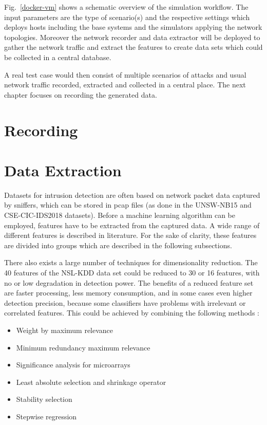 \documentclass[conference]{IEEEtran}
\begin{document}
Fig.~\ref{docker-vm} shows a schematic overview of the simulation workflow. The input parameters are the type of scenario(s) and the respective settings which deploys hosts including the base systems and the simulators applying the network topologies. Moreover the network recorder and data extractor will be deployed to gather the network traffic and extract the features to create data sets which could be collected in a central database.

A real test case would then consist of multiple scenarios of attacks and usual network traffic recorded, extracted and collected in a central place. The next chapter focuses on recording the generated data.

\section{Recording}

\section{Data Extraction}

Datasets for intrusion detection are often based on network packet data captured by sniffers, which can be stored in pcap files (as done in the UNSW-NB15 \cite{Nb2015} and CSE-CIC-IDS2018 \cite{Ids2018} datasets). Before a machine learning algorithm can be employed, features have to be extracted from the captured data. A wide range of different features is described in literature. For the sake of clarity, these features are divided into groups which are described in the following subsections.

There also exists a large number of techniques for dimensionality reduction. The 40 features of the NSL-KDD data set could be reduced to 30 or 16 features, with no or low degradation in detection power. The benefits of a reduced feature set are faster processing, less memory consumption, and in some cases even higher detection precision, because some classifiers have problems with irrelevant or correlated features. This could be achieved by combining the following methods \cite{vasquez2014}:
\begin{itemize}
	\item Weight by maximum relevance
	\item Minimum redundancy maximum relevance
	\item Significance analysis for microarrays
	\item Least absolute selection and shrinkage operator
	\item Stability selection
	\item Stepwise regression
\end{itemize}
\end{document}
